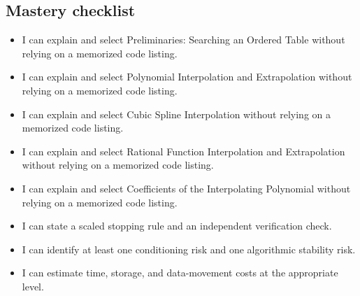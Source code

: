 \documentclass[10pt,letterpaper]{article}
\begin{document}
\subsection*{Mastery checklist}
\begin{itemize}
\item[$\square$] I can explain and select Preliminaries: Searching an Ordered Table without relying on a memorized code listing.
\item[$\square$] I can explain and select Polynomial Interpolation and Extrapolation without relying on a memorized code listing.
\item[$\square$] I can explain and select Cubic Spline Interpolation without relying on a memorized code listing.
\item[$\square$] I can explain and select Rational Function Interpolation and Extrapolation without relying on a memorized code listing.
\item[$\square$] I can explain and select Coefficients of the Interpolating Polynomial without relying on a memorized code listing.
\item[$\square$] I can state a scaled stopping rule and an independent verification check.
\item[$\square$] I can identify at least one conditioning risk and one algorithmic stability risk.
\item[$\square$] I can estimate time, storage, and data-movement costs at the appropriate level.
\end{itemize}
\end{document}
